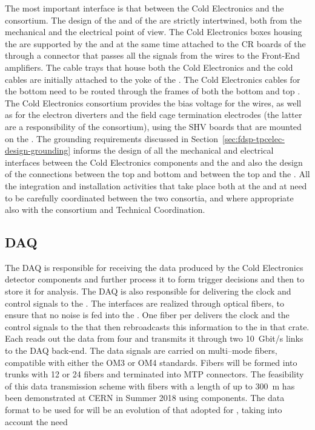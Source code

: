 The most important interface is that between the Cold Electronics
and the  consortium. The design of the 
and of the  are strictly intertwined, both from the
mechanical and the electrical point of view. The Cold Electronics
boxes housing the  are supported by the 
and at the same time attached to the CR boards of the 
through a connector that passes all the signals from the wires to
the Front-End amplifiers. The cable trays that house both the
Cold Electronics and the  cold cables are initially
attached to the yoke of the . The Cold Electronics
cables for the bottom  need to be routed through the 
frames of both the bottom and top . The Cold
Electronics consortium provides the bias voltage for the 
wires, as well as for the electron diverters and the field
cage termination electrodes (the latter are a responsibility of
the  consortium), using the SHV boards that are mounted
on the . The grounding requirements discussed in
Section~\ref{sec:fdsp-tpcelec-design-grounding} informs the
design of all the mechanical and electrical interfaces between
the Cold Electronics components and the  and also the
design of the connections between the top and bottom 
and between the top  and the . All the
integration and installation activities that take place both at
the  and at \surf need to be carefully coordinated between
the two consortia, and where appropriate also with the 
consortium and Technical Coordination.

\subsection{DAQ}
\label{sec:fdsp-tpcelec-interfaces-daq}

The DAQ is responsible for receiving the data produced by the
Cold Electronics detector components and further process it to
form trigger decisions and then to store it for analysis. The 
DAQ is also responsible for delivering the clock and control
signals to the . The interfaces are realized 
through optical fibers, to ensure that no noise is fed into
the . One fiber per  delivers the
clock and the control signals to the  that then
rebroadcasts this information to the  in that 
crate. Each  reads out the data from four 
and transmits it through two 10~Gbit/s links to the DAQ back-end.
The data signals are carried on multi--mode fibers, compatible with 
either the OM3 or OM4 standards. Fibers will be formed into trunks with 
12 or 24 fibers and terminated into MTP connectors. The feasibility
of this data transmission scheme with fibers with a length of up
to 300~m has been demonstrated at CERN in Summer 2018 using 
 components. The data format to be used for 
 will be an evolution of that adopted for
, taking into account the need 

